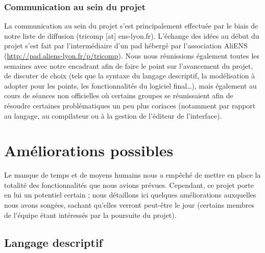\documentclass{article}
\begin{document}

\subsubsection{Communication au sein du projet}

La communication au sein du projet s'est principalement effectuée par le biais de notre liste
de diffusion (tricomp [at] ens-lyon.fr). L'échange des idées au début du projet s'est 
fait par l'intermédiaire d'un pad hébergé par l'association AliENS (\url{http://pad.aliens-lyon.fr/p/tricomp}). 
Nous nous réunissions également toutes les semaines avec notre encadrant afin de faire le point 
sur l'avancement du projet, de discuter de choix (tels que la syntaxe du langage descriptif, 
la modélisation à adopter pour les points, les fonctionnalités du logiciel final\dots), mais 
également au cours de séances non officielles où certains groupes se réunissaient 
afin de résoudre certaines problématiques un peu plus coriaces (notamment par rapport au langage, 
au compilateur ou à la gestion de l'éditeur de l'interface).

\section{Améliorations possibles}

Le manque de temps et de moyens humains nous a empêché de mettre en
place la totalité des fonctionnalités que nous avions prévues. Cependant, 
ce projet porte en lui un potentiel certain ; nous détaillons
ici quelques améliorations auxquelles nous avons songées, sachant qu'elles verront
peut-être le jour (certains membres de l'équipe étant intéressés par la 
poursuite du projet).

\subsection{Langage descriptif}
\end{document}
